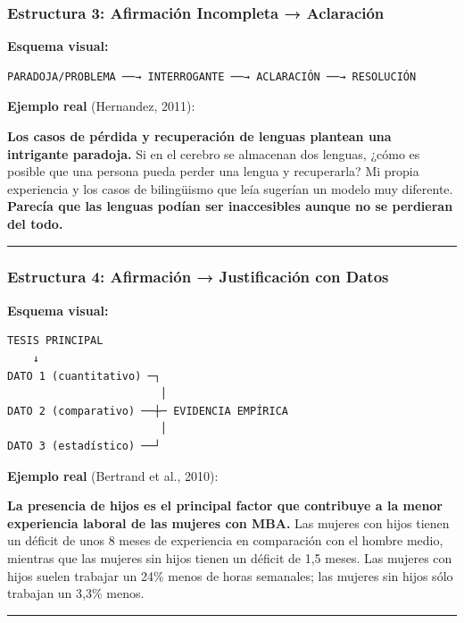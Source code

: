 \documentclass[
  11pt,
]{beaner}
\begin{document}
\subsubsection{Estructura 3: Afirmación Incompleta →
Aclaración}\label{estructura-3-afirmaciuxf3n-incompleta-aclaraciuxf3n}

\textbf{Esquema visual:}

\begin{verbatim}
PARADOJA/PROBLEMA ──→ INTERROGANTE ──→ ACLARACIÓN ──→ RESOLUCIÓN
\end{verbatim}

\textbf{Ejemplo real} (Hernandez, 2011):

{\textbf{Los casos de pérdida y recuperación de lenguas plantean una
intrigante paradoja.}} Si en el cerebro se almacenan dos lenguas, ¿cómo
es posible que una persona pueda perder una lengua y recuperarla? Mi
propia experiencia y los casos de bilingüismo que leía sugerían un
modelo muy diferente. {\textbf{Parecía que las lenguas podían ser
inaccesibles aunque no se perdieran del todo.}}

\begin{center}\rule{0.5\linewidth}{0.5pt}\end{center}

\subsubsection{Estructura 4: Afirmación → Justificación con
Datos}\label{estructura-4-afirmaciuxf3n-justificaciuxf3n-con-datos}

\textbf{Esquema visual:}

\begin{verbatim}
TESIS PRINCIPAL
    ↓
DATO 1 (cuantitativo) ─┐
                        │
DATO 2 (comparativo) ──┼─ EVIDENCIA EMPÍRICA
                        │
DATO 3 (estadístico) ──┘
\end{verbatim}

\textbf{Ejemplo real} (Bertrand et al., 2010):

{\textbf{La presencia de hijos es el principal factor que contribuye a
la menor experiencia laboral de las mujeres con MBA.}} Las mujeres con
hijos tienen un déficit de unos 8 meses de experiencia en comparación
con el hombre medio, mientras que las mujeres sin hijos tienen un
déficit de 1,5 meses. Las mujeres con hijos suelen trabajar un 24\%
menos de horas semanales; las mujeres sin hijos sólo trabajan un 3,3\%
menos.

\begin{center}\rule{0.5\linewidth}{0.5pt}\end{center}
\end{document}

